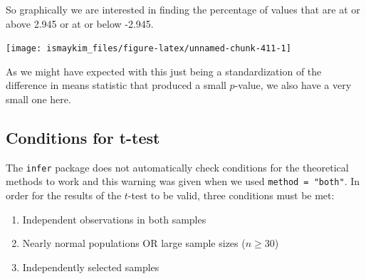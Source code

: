\documentclass[12pt,]{krantz}
\makeatletter
\newenvironment{Shaded}{\begin{snugshade}}{\end{snugshade}}
\newcommand{\KeywordTok}[1]{\textcolor[rgb]{0.27,0.27,0.27}{\textbf{#1}}}
\newcommand{\DataTypeTok}[1]{\textcolor[rgb]{0.27,0.27,0.27}{#1}}
\newcommand{\StringTok}[1]{\textcolor[rgb]{0.5,0.5,0.5}{#1}}
\newcommand{\OperatorTok}[1]{\textcolor[rgb]{0.43,0.43,0.43}{\textbf{#1}}}
\newcommand{\NormalTok}[1]{#1}
\providecommand{\tightlist}{%
  \setlength{\itemsep}{0pt}\setlength{\parskip}{0pt}}
\newenvironment{kframe}{%
\medskip{}
\setlength{\fboxsep}{.8em}
 \def\at@end@of@kframe{}%
 \ifinner\ifhmode%
  \def\at@end@of@kframe{\end{minipage}}%
  \begin{minipage}{\columnwidth}%
 \fi\fi%
 \def\FrameCommand##1{\hskip\@totalleftmargin \hskip-\fboxsep
 \colorbox{shadecolor}{##1}\hskip-\fboxsep
     \hskip-\linewidth \hskip-\@totalleftmargin \hskip\columnwidth}%
 \MakeFramed {\advance\hsize-\width
   \@totalleftmargin\z@ \linewidth\hsize
   \@setminipage}}%
 {\par\unskip\endMakeFramed%
 \at@end@of@kframe}
\renewenvironment{Shaded}{\begin{kframe}}{\end{kframe}}
\theoremstyle{definition}
\theoremstyle{definition}
\theoremstyle{definition}
\theoremstyle{remark}
\makeatother
\begin{document}
\begin{Shaded}
\end{Shaded}

So graphically we are interested in finding the percentage of values
that are at or above 2.945 or at or below -2.945.

\begin{Shaded}
\end{Shaded}

\begin{center}\texttt{[image: ismaykim\_files/figure-latex/unnamed-chunk-411-1]} \end{center}

As we might have expected with this just being a standardization of the
difference in means statistic that produced a small \(p\)-value, we also
have a very small one here.

\subsection{Conditions for t-test}\label{conditions-for-t-test}

The \texttt{infer} package does not automatically check conditions for
the theoretical methods to work and this warning was given when we used
\texttt{method\ =\ "both"}. In order for the results of the \(t\)-test
to be valid, three conditions must be met:

\begin{enumerate}
\def\labelenumi{\arabic{enumi}.}
\tightlist
\item
  Independent observations in both samples
\item
  Nearly normal populations OR large sample sizes (\(n \ge 30\))
\item
  Independently selected samples
\end{enumerate}
\end{document}
